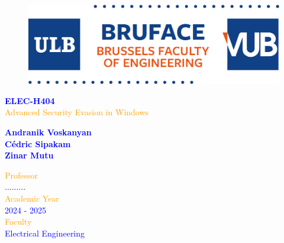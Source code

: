 \begin{titlepage}
	\begin{center}
            \begin{figure}
                \centering
                \includegraphics[scale=0.3]{Images/logo.png}
            \end{figure}
		\vspace*{\fill}
            \normalsize
            {\selectfont
            \textcolor{blue}{\textbf{ELEC-H404}}}\\
            \vspace{0.2cm}
		\Huge
            {\selectfont
            \textcolor{orange}{Advanced Security Evasion in Windows}}\\
        \end{center}
	\begin{center}	
		\vspace{0.5cm}
            \Large
            {\selectfont
		\textcolor{blue}{\textbf{Andranik Voskanyan\\
								Cédric Sipakam\\
								Zinar Mutu}}}\\
	\end{center}
        \vspace*{\fill}
        \begin{FlushRight}
            {\selectfont
            \textcolor{orange}{Professor}}\\
            {\selectfont
            \textcolor{blue}{.........}}\\
            \vspace{0.6cm}
            {\selectfont
            \textcolor{orange}{Academic Year}}\\
            {\selectfont
            \textcolor{blue}{2024 - 2025}}\\
            \vspace{0.6cm}
            {\selectfont
            \textcolor{orange}{Faculty}}\\
            {\selectfont
            \textcolor{blue}{Electrical Engineering}}
        \end{FlushRight}



\end{titlepage}